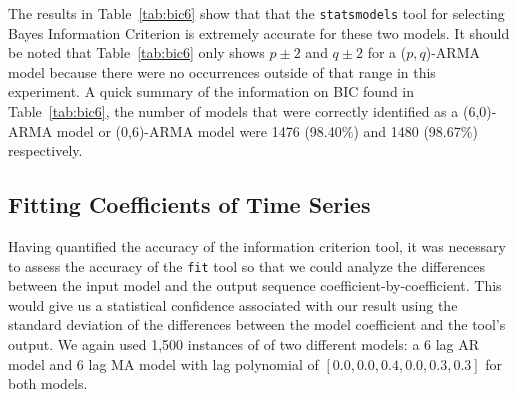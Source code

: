 \documentclass[oneside,12pt,openany]{book}
\begin{document}
    
    The results in Table~\ref{tab:bic6} show that that the \texttt{statsmodels} tool for selecting Bayes Information Criterion is extremely accurate for these two models. It should be noted that Table~\ref{tab:bic6} only shows $p\pm2$ and $q\pm2$ for a ($p,q$)-ARMA model because there were no occurrences outside of that range in this experiment. A quick summary of the information on BIC found in Table~\ref{tab:bic6}, the number of models that were correctly identified as a (6,0)-ARMA model or (0,6)-ARMA model were 1476 (98.40\%) and 1480 (98.67\%) respectively.
    \FloatBarrier
    
    \subsection{Fitting Coefficients of Time Series}
    
    Having quantified the accuracy of the information criterion tool, it was necessary to assess the accuracy of the \texttt{fit} tool so that we could analyze the differences between the input model and the output sequence coefficient-by-coefficient. This would give us a statistical confidence associated with our result using the standard deviation of the differences between the model coefficient and the tool's output. We again used 1,500 instances of of two different models: a 6 lag AR model and 6 lag MA model with lag polynomial of $[0.0,0.0,0.4,0.0,0.3,0.3]$ for both models.
    
    \FloatBarrier
    
\end{document}
